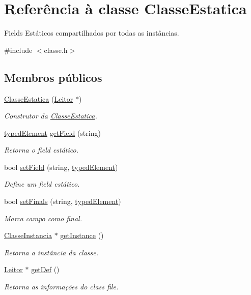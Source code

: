 \hypertarget{classClasseEstatica}{}\section{Referência à classe Classe\+Estatica}
\label{classClasseEstatica}


Fields Estáticos compartilhados por todas as instâncias.  




{\ttfamily \#include $<$classe.\+h$>$}

\subsection*{Membros públicos}
\begin{DoxyCompactItemize}
\item 
\hyperlink{classClasseEstatica_a4e584d8a91a0f7c5ce9a64a78bbb1f50}{Classe\+Estatica} (\hyperlink{classLeitor}{Leitor} $\ast$)
\begin{DoxyCompactList}\small\item\em Construtor da \hyperlink{classClasseEstatica}{Classe\+Estatica}. \end{DoxyCompactList}\item 
\hyperlink{structtypedElement__s}{typed\+Element} \hyperlink{classClasseEstatica_ae85fd5cef4bbed1294562e497a6611a7}{get\+Field} (string)
\begin{DoxyCompactList}\small\item\em Retorna o field estático. \end{DoxyCompactList}\item 
bool \hyperlink{classClasseEstatica_acc2669d695a4f733ec61f2c77eb92920}{set\+Field} (string, \hyperlink{structtypedElement__s}{typed\+Element})
\begin{DoxyCompactList}\small\item\em Define um field estático. \end{DoxyCompactList}\item 
bool \hyperlink{classClasseEstatica_a58dcce56287bc06d3e076382ec85df09}{set\+Finals} (string, \hyperlink{structtypedElement__s}{typed\+Element})
\begin{DoxyCompactList}\small\item\em Marca campo como final. \end{DoxyCompactList}\item 
\hyperlink{classClasseInstancia}{Classe\+Instancia} $\ast$ \hyperlink{classClasseEstatica_a426c3626c527013a975a80146394364a}{get\+Instance} ()
\begin{DoxyCompactList}\small\item\em Retorna a instância da classe. \end{DoxyCompactList}\item 
\hyperlink{classLeitor}{Leitor} $\ast$ \hyperlink{classClasseEstatica_a5cf4c48a80b40143af26acde5f802776}{get\+Def} ()
\begin{DoxyCompactList}\small\item\em Retorna as informações do class file. \end{DoxyCompactList}\end{DoxyCompactItemize}


